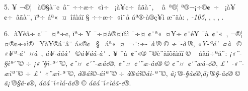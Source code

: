 \documentclass[12pt,a4paper]{article}
\begin{document}
5. ^^8d^^a5 ^^ac^^ae^^a6^^ad^^a0 ^^e0^^ae^^a7^^e0^^a8^^a2^^a0^^e2^^a8 ^^f7^^ad^^f7^^e6^^f7^^a0^^ab^^ec^^ad^^f7 ^^a0^^a1^^e0^^a5^^a2^^f7^^a0^^e2^^e3^^e0^^a8, ^^a0 ^^e2^^a0^^aa^^ae^^a6\linebreak
^^aa^^ae^^ac^^a1^^f7^^ad^^ae^^a2^^a0^^ad^^f7 ^^a0^^a1^^e0^^a5^^a2^^f7^^a0^^e2^^e3^^e0^^a8, ^^ef^^aa^^f7 ^^e1^^aa^^ab^^a0^^a4^^a0^^ee^^e2^^ec^^e1^^ef ^^a7 ^^f7^^ad^^f7^^e6^^f7^^a0^^ab^^ec^^ad^^a8^^e5 ^^e1^^aa^^ae-\linebreak{}^^e0^^ae^^e7^^a5^^ad^^ec
^^e6^^a8^^e4^^e0: \mbox{\emph{^^80^^85^^91}}, \mbox{\emph{^^8b^^80^^87-105}}, \mbox{\emph{^^8c^^80^^83^^80^^92^^85}},
\mbox{\emph{^^8c^^80^^93}}, \mbox{\emph{^^8d^^92^^98}}, \mbox{\emph{^^93^^80^^8f^^96}}.

6. ^^93 ^^e0^^a5^^e8^^e2^^f7 ^^a2^^a8^^af^^a0^^a4^^aa^^f7^^a2, ^^ef^^aa^^f7 ^^ad^^a5 ^^af^^f7^^a4^^e5^^ae^^a4^^ef^^e2^^ec ^^af^^f7^^a4 ^^a2^^a8^^aa^^ab^^a0^^a4^^a5^^ad^^f7 ^^a2^^a8^^e9^^a5\linebreak
^^af^^e0^^a0^^a2^^a8^^ab^^a0, ^^ac^^ae^^a6^^ad^^a0 ^^a4^^ae^^a2^^f7^^ab^^ec^^ad^^ae ^^af^^a5^^e0^^a5^^ad^^ae^^e1^^a8^^e2^^a8 ^^e1^^ab^^ae^^a2^^a0 ^^a7^^a0 ^^e1^^aa^^ab^^a0^^a4^^a0^^ac^^a8:\linebreak \emph{^^84^^ad^^f7-^^af^^e0\'^^ae} ^^a9
\emph{^^84^^ad^^f7^^af-^^e0\'^^ae}, \emph{^^8e^^ab^^a5-^^aa^^e1\'^^a0^^ad^^a4^^e0^^a0} ^^a9 \emph{^^8e^^ab^^a5^^aa-^^e1\'^^a0^^ad^^a4^^e0^^a0},
\emph{^^e1^^a5-^^e1^^e2^^e0\'^^a0} ^^a9\linebreak \emph{^^e1^^a5^^e1^^e2-^^e0\'^^a0}. ^^96^^a5 ^^af^^e0^^a0^^a2^^a8^^ab^^ae ^^af^^ae^^e8^^a8^^e0^^ee^^f5^^e2^^ec^^e1^^ef ^^a9 ^^ad^^a0 ^^e1^^e3^^e4^^f7^^aa^^e1^^a8:
\emph{^^a1^^ab^^a8-^^a7^^ec^^aa\'^^a8^^a9} ^^f7 \emph{^^a1^^ab^^a8^^a7^^ec-^^aa\'^^a8^^a9}, \emph{^^a2^^a8^^a4^^a0^^a2^^ad\'^^a8-^^e6^^e2^^a2^^ae},
\emph{^^a2^^a8^^a4^^a0^^a2^^ad\'^^a8^^e6-^^e2^^a2^^ae} ^^a9 \emph{^^a2^^a8^^a4^^a0^^a2^^ad\'^^a8^^e6^^e2-^^a2^^ae}, \emph{^^a3\'^^a0-\linebreak{}^^ab^^a8-^^e6^^ec^^aa^^a8^^a9} ^^f7
\emph{^^a3\'^^a0^^ab^^a8^^e6^^ec-^^aa^^a8^^a9}, \emph{^^e0^^ae^^e1\'\i^^a9-^^e1^^ec^^aa^^a8^^a9} ^^f7 \emph{^^e0^^ae^^e1\'\i^^a9^^e1^^ec-^^aa^^a8^^a9},
\emph{^^e3^^a1\'^^ae-^^a7^^e2^^a2^^ae},\linebreak \emph{^^e3^^a1\'^^ae^^a7-^^e2^^a2^^ae} ^^a9 \emph{^^e3^^a1\'^^ae^^a7^^e2-^^a2^^ae},
\emph{^^e1^^e3^^e1^^af\'\i^^ab^^ec^^e1-^^e2^^a2^^ae} ^^a9 \emph{^^e1^^e3^^e1^^af\'\i^^ab^^ec^^e1^^e2-^^a2^^ae}.
\end{document}
